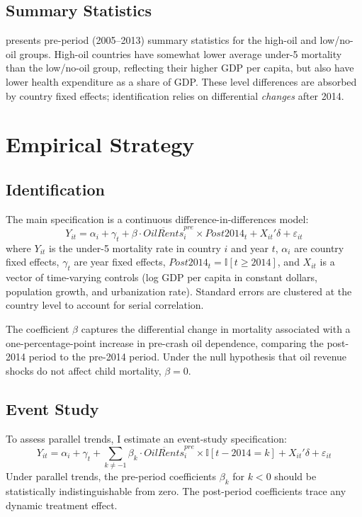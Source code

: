 \documentclass[12pt]{article}
\newcommand{\ind}{\mathbb{I}}
\begin{document}
\subsection{Summary Statistics}



 presents pre-period (2005--2013) summary statistics for the high-oil and low/no-oil groups. High-oil countries have somewhat lower average under-5 mortality than the low/no-oil group, reflecting their higher GDP per capita, but also have lower health expenditure as a share of GDP. These level differences are absorbed by country fixed effects; identification relies on differential \textit{changes} after 2014.


\section{Empirical Strategy}
\label{sec:strategy}

\subsection{Identification}

The main specification is a continuous difference-in-differences model:
\begin{equation}
\label{eq:main}
Y_{it} = \alpha_i + \gamma_t + \beta \cdot \overline{OilRents}_{i}^{pre} \times Post2014_t + X_{it}'\delta + \varepsilon_{it}
\end{equation}
where $Y_{it}$ is the under-5 mortality rate in country $i$ and year $t$, $\alpha_i$ are country fixed effects, $\gamma_t$ are year fixed effects, $Post2014_t = \ind[t \geq 2014]$, and $X_{it}$ is a vector of time-varying controls (log GDP per capita in constant dollars, population growth, and urbanization rate). Standard errors are clustered at the country level to account for serial correlation.

The coefficient $\beta$ captures the differential change in mortality associated with a one-percentage-point increase in pre-crash oil dependence, comparing the post-2014 period to the pre-2014 period. Under the null hypothesis that oil revenue shocks do not affect child mortality, $\beta = 0$.

\subsection{Event Study}

To assess parallel trends, I estimate an event-study specification:
\begin{equation}
\label{eq:event}
Y_{it} = \alpha_i + \gamma_t + \sum_{k \neq -1} \beta_k \cdot \overline{OilRents}_{i}^{pre} \times \ind[t - 2014 = k] + X_{it}'\delta + \varepsilon_{it}
\end{equation}
Under parallel trends, the pre-period coefficients $\beta_k$ for $k < 0$ should be statistically indistinguishable from zero. The post-period coefficients trace any dynamic treatment effect.
\end{document}
